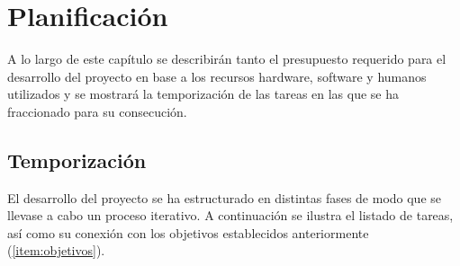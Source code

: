 \chapter{Planificación}

\vspace{-3mm}

A lo largo de este capítulo se describirán tanto el presupuesto requerido para el desarrollo del proyecto en base a los recursos hardware, software y humanos utilizados y se mostrará la temporización de las tareas en las que se ha fraccionado para su consecución.


\section{Temporización}

El desarrollo del proyecto se ha estructurado en distintas fases de modo que se llevase a cabo un proceso iterativo. A continuación se ilustra el listado de tareas, así como su conexión con los objetivos establecidos anteriormente (\ref{item:objetivos}).

\vspace{-1mm}

